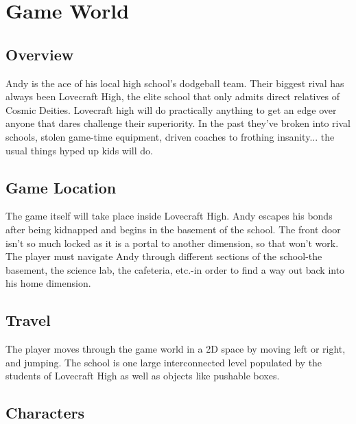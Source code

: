 \documentclass [12pt]{article}
\begin{document}
\section*{Game World}

\subsection*{Overview}

Andy is the ace of his local high school's dodgeball team. Their biggest rival has always been Lovecraft High, the elite school that only admits direct relatives of Cosmic Deities. Lovecraft high will do practically anything to get an edge over anyone that dares challenge their superiority. In the past they've broken into rival schools, stolen game-time equipment, driven coaches to frothing insanity... the usual things hyped up kids will do.

\subsection*{Game Location}

The game itself will take place inside Lovecraft High. Andy escapes his bonds after being kidnapped and begins in the basement of the school. The front door isn't so much locked as it is a portal to another dimension, so that won't work. The player must navigate Andy through different sections of the school-the basement, the science lab, the cafeteria, etc.-in order to find a way out back into his home dimension.

\subsection*{Travel}

The player moves through the game world in a 2D space by moving left or right, and jumping. The school is one large interconnected level populated by the students of Lovecraft High as well as objects like pushable boxes.
\newpage

\subsection*{Characters}
\end{document}
